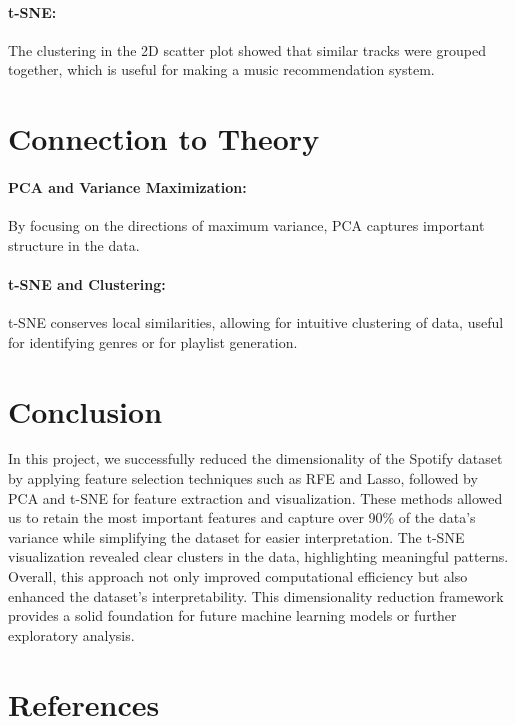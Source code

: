 \documentclass{article}
\begin{document}
\paragraph{t-SNE:}
The clustering in the 2D scatter plot showed that similar tracks were grouped together, which is useful for making a music recommendation system.

\section{Connection to Theory}
\paragraph{PCA and Variance Maximization:}
By focusing on the directions of maximum variance, PCA captures important structure in the data.
\paragraph{t-SNE and Clustering:}
t-SNE conserves local similarities, allowing for intuitive clustering of data, useful for identifying genres or for playlist generation.

\section{Conclusion}

In this project, we successfully reduced the dimensionality of the Spotify dataset by applying feature selection techniques such as RFE and Lasso, followed by PCA and t-SNE for feature extraction and visualization. These methods allowed us to retain the most important features and capture over 90\% of the data's variance while simplifying the dataset for easier interpretation. The t-SNE visualization revealed clear clusters in the data, highlighting meaningful patterns. Overall, this approach not only improved computational efficiency but also enhanced the dataset's interpretability. This dimensionality reduction framework provides a solid foundation for future machine learning models or further exploratory analysis.




\section{References}
\end{document}
